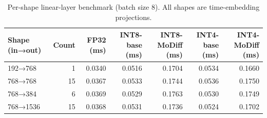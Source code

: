 \begin{table}[htbp]
\centering
\small
\caption{Per-shape linear-layer benchmark (batch size 8). All shapes are time-embedding projections.}
\label{tab:linear_layer}
\begin{tabular}{lrrrrrr}
\toprule
Shape (in→out) & Count & FP32 (ms) & INT8-base (ms) & INT8-MoDiff (ms) & INT4-base (ms) & INT4-MoDiff (ms) \\
\midrule
192→768 & 1 & 0.0340 & 0.0516 & 0.1704 & 0.0534 & 0.1660 \\
768→768 & 15 & 0.0367 & 0.0533 & 0.1744 & 0.0536 & 0.1750 \\
768→384 & 6 & 0.0369 & 0.0529 & 0.1763 & 0.0530 & 0.1749 \\
768→1536 & 15 & 0.0368 & 0.0531 & 0.1736 & 0.0524 & 0.1702 \\
\bottomrule
\end{tabular}
\end{table}
